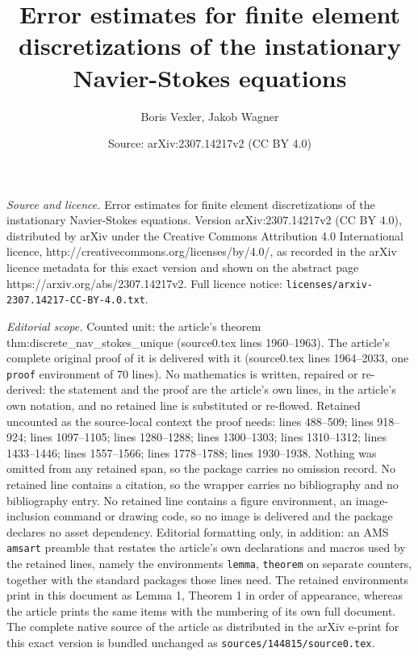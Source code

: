 \documentclass[10pt,a4paper]{amsart}
\title{Error estimates for finite element discretizations of the instationary Navier-Stokes equations}
\author{Boris Vexler, Jakob Wagner}
\date{Source: arXiv:2307.14217v2 (CC BY 4.0)}
\begin{document}
\maketitle

\noindent\emph{Source and licence.} Error estimates for finite element discretizations of the instationary Navier-Stokes equations. Version arXiv:2307.14217v2 (CC BY 4.0), distributed by arXiv under the Creative Commons Attribution 4.0 International licence, http://creativecommons.org/licenses/by/4.0/, as recorded in the arXiv licence metadata for this exact version and shown on the abstract page https://arxiv.org/abs/2307.14217v2. Full licence notice: \texttt{licenses/arxiv-2307.14217-CC-BY-4.0.txt}.\par\smallskip

\noindent\textit{Editorial scope.} Counted unit: the article's theorem thm:discrete\_nav\_stokes\_unique (source0.tex lines 1960--1963). The article's complete original proof of it is delivered with it (source0.tex lines 1964--2033, one \texttt{proof} environment of 70 lines). No mathematics is written, repaired or re-derived: the statement and the proof are the article's own lines, in the article's own notation, and no retained line is substituted or re-flowed.  Retained uncounted as the source-local context the proof needs: lines 488--509; lines 918--924; lines 1097--1105; lines 1280--1288; lines 1300--1303; lines 1310--1312; lines 1433--1446; lines 1557--1566; lines 1778--1788; lines 1930--1938.  Nothing was omitted from any retained span, so the package carries no omission record.  No retained line contains a citation, so the wrapper carries no bibliography and no bibliography entry.  No retained line contains a figure environment, an image-inclusion command or drawing code, so no image is delivered and the package declares no asset dependency.  Editorial formatting only, in addition: an AMS \texttt{amsart} preamble that restates the article's own declarations and macros used by the retained lines, namely the environments \texttt{lemma}, \texttt{theorem} on separate counters, together with the standard packages those lines need.  The retained environments print in this document as Lemma 1, Theorem 1 in order of appearance, whereas the article prints the same items with the numbering of its own full document.  The complete native source of the article as distributed in the arXiv e-print for this exact version is bundled unchanged as \texttt{sources/144815/source0.tex}.
\end{document}
